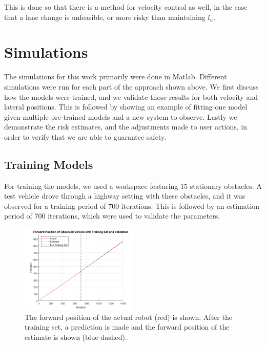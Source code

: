 \documentclass[letterpaper, 10 pt, conference]{ieeeconf}  %
\begin{document}
This is done so that there is a method for velocity control as well, in the case that a lane change is unfeasible, or more risky than maintaining $l_u$.


\section{Simulations} \label{sec:sims}
The simulations for this work primarily were done in Matlab. Different simulations were run for each part of the approach shown above. We first discuss how the models were trained, and we validate those results for both velocity and lateral positions. This is followed by showing an example of fitting one model given multiple pre-trained models and a new system to observe. Lastly we demonstrate the risk estimates, and the adjustments made to user actions, in order to verify that we are able to guarantee safety.

\subsection{Training Models}
For training the models, we used a workspace featuring $15$ stationary obstacles. A test vehicle drove through a highway setting with these obstacles, and it was observed for a training period of 700 iterations. This is followed by an estimation period of 700 iterations, which were used to validate the parameters.

\begin{figure}[ht]
    \includegraphics[width=0.5\textwidth]{train1.png}
    \caption{The forward position of the actual robot (red) is shown. After the training set, a prediction is made and the forward position of the estimate is shown (blue dashed).}
    \label{fig:train1}
\end{figure}
\end{document}
